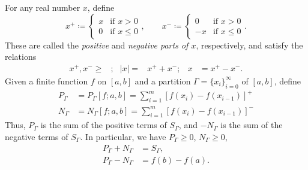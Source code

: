 For any real number $x$, define
\[
x^+\coloneqq
\begin{cases}
x&\text{if $x>0$}\\
0&\text{if $x\leq 0$}
\end{cases},
\qquad
x^-\coloneqq
\begin{cases}
0&\text{if $x>0$}\\
-x&\text{if $x\leq 0$}
\end{cases}.
\]
These are called the \emph{positive} and \emph{negative parts of $x$},
respectively, and satisfy the relations
\[
\begin{aligned}
x^+,x^-\geq{}&;&|x|={}&x^++x^-;&x&=x^+-x^-.
\end{aligned}
\]
Given a finite function $f$ on $[a,b]$ and a partition
$\Gamma={\{x_i\}}_{i=0}^\infty$ of $[a,b]$, define
\[
\begin{aligned}
P_\Gamma&=P_\Gamma[f;a,b]=\sum_{i=1}^m{[f(x_i)-f(x_{i-1})]}^+\\
N_\Gamma&=N_\Gamma[f;a,b]=\sum_{i=1}^m{[f(x_i)-f(x_{i-1})]}^-
\end{aligned}
\]
Thus, $P_\Gamma$ is the sum of the positive terms of $S_\Gamma$, and
$-N_\Gamma$ is the sum of the negative terms of $S_\Gamma$. In particular,
we have $P_\Gamma\geq 0$, $N_\Gamma\geq 0$,
\begin{equation}
\label{eq:p-gamma-n-gamma-sums}
\begin{aligned}
P_\Gamma+N_\Gamma&=S_\Gamma,\\
P_\Gamma-N_\Gamma&=f(b)-f(a).
\end{aligned}
\end{equation}

